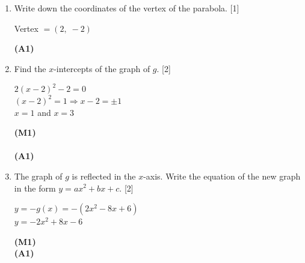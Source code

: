 \documentclass[12pt, twoside]{article}
\begin{document}
\begin{enumerate}[itemsep=0.2cm]
\begin{enumerate}[itemsep=0.3cm]
  \medskip
  \item Write down the coordinates of the vertex of the parabola. \hfill [1]

  \begin{minipage}[t]{0.62\textwidth}
  Vertex $= (2,\; -2)$
  \end{minipage}%
  \begin{minipage}[t]{0.35\textwidth}\raggedleft
  \textbf{(A1)}
  \end{minipage}

  \medskip
  \item Find the $x$-intercepts of the graph of $g$. \hfill [2]

  \begin{minipage}[t]{0.62\textwidth}
  $2(x - 2)^2 - 2 = 0$\\[0.15cm]
  $(x - 2)^2 = 1 \Rightarrow x - 2 = \pm 1$\\[0.15cm]
  $x = 1$ and $x = 3$
  \end{minipage}%
  \begin{minipage}[t]{0.35\textwidth}\raggedleft
  \textbf{(M1)}\\[0.15cm]
  ~\\[0.15cm]
  \textbf{(A1)}
  \end{minipage}

  \medskip
  \item The graph of $g$ is reflected in the $x$-axis. Write the equation
        of the new graph in the form $y = ax^2 + bx + c$. \hfill [2]

  \begin{minipage}[t]{0.62\textwidth}
  $y = -g(x) = -(2x^2 - 8x + 6)$\\[0.15cm]
  $y = -2x^2 + 8x - 6$
  \end{minipage}%
  \begin{minipage}[t]{0.35\textwidth}\raggedleft
  \textbf{(M1)}\\[0.15cm]
  \textbf{(A1)}
  \end{minipage}
\end{enumerate}

\end{enumerate}
\end{document}
